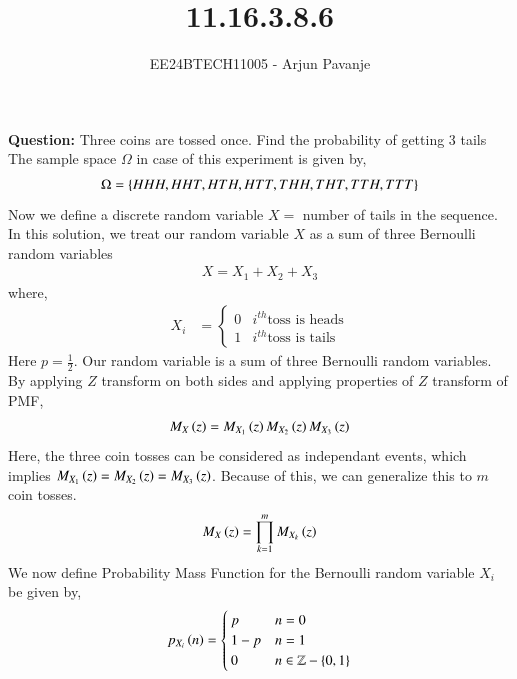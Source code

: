 \documentclass[journal]{IEEEtran}
\begin{document}

\vspace{3cm}

\title{11.16.3.8.6}
\author{EE24BTECH11005 - Arjun Pavanje}
{\let\newpage\relax\maketitle}
\textbf{Question:}\newline
Three coins are tossed once. Find the probability of getting 3 tails \newline
\solution \newline
The sample space $\Omega$ in case of this experiment is given by,
\begin{align}
  \Omega = \left\{HHH, HHT, HTH, HTT, THH, THT, TTH, TTT\right\}
\end{align} 
Now we define a discrete random variable $X =$ number of tails in the sequence. In this solution, we treat our random variable $X$ as a sum of three Bernoulli random variables
\begin{align}
 X = X_1 + X_2 + X_3
\end{align}
where,
\begin{align}
  X_i &= \begin{cases}
    0 & i^{th}\text{toss is heads}\\
    1 & i^{th}\text{toss is tails}
  \end{cases}
\end{align}
Here $p = \frac{1}{2}$. Our random variable is a sum of three Bernoulli random variables. By applying $Z$ transform on both sides and applying properties of $Z$ transform of PMF, 
\begin{align}
  M_X\left(z\right) = M_{X_1}\left(z\right) M_{X_2}\left(z\right)M_{X_3}\left(z\right) 
\end{align}
Here, the three coin tosses can be considered as independant events, which implies  $ M_{X_1}\left(z\right) = M_{X_2}\left(z\right) = M_{X_3}\left(z\right)$. Because of this, we can generalize this to $m$ coin tosses.
\begin{align}
  M_X\left(z\right) = \prod_{k=1}^{m} M_{X_k}\left(z\right)
\end{align}
We now define Probability Mass Function for the Bernoulli random variable $X_i$ be given by,
\begin{align}
  p_{X_i}\left(n\right) = \begin{cases}
    p & n = 0\\
    1-p & n = 1\\
    0 &  n \in \mathbb{Z} - \left\{0,1\right\}
  \end{cases}
\end{align}
\end{document}
